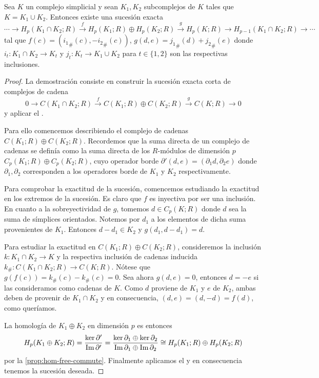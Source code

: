 \begin{proposicion}
	Sea $K$ un complejo simplicial y sean $K_1,K_2$ subcomplejos de $K$ tales que $K = K_1 \cup K_2$. Entonces existe una sucesión exacta
	\[
		\cdots \to H_p(K_1 \cap K_2;R) \overset{f}{\to} H_p(K_1;R) \oplus H_p(K_2;R) \overset{g}{\to} H_p(K;R) \to H_{p-1}(K_1 \cap K_2;R) \to \cdots
	\]
	tal que $f(c) = ({i_1}_\#(c),-{i_2}_\#(c))$, $g(d,e) = {j_1}_\#(d)+{j_2}_\#(e)$ donde $i_t: K_1 \cap K_2 \to K_t$ y $j_t: K_t \to K_1 \cup K_2$ para $t \in \{1,2\}$ son las respectivas inclusiones.
\end{proposicion}
\begin{proof}
	La demostración consiste en construir la sucesión exacta corta de complejos de cadena
	\[
		0 \to C(K_1 \cap K_2;R) \overset{f}{\to} C(K_1;R) \oplus C(K_2;R) \overset{g}{\to} C(K;R) \to 0
	\]
	y aplicar el .
	
	Para ello comencemos describiendo el complejo de cadenas $C(K_1;R) \oplus C(K_2;R)$. Recordemos que la suma directa de un complejo de cadenas se definía como la suma directa de los $R$-módulos de dimensión $p$ $C_p(K_1;R) \oplus C_p(K_2;R)$, cuyo operador borde $\partial'(d,e) = (\partial_1d, \partial_2 e)$ donde $\partial_1, \partial_2$ corresponden a los operadores borde de $K_1$ y $K_2$ respectivamente.
	
	Para comprobar la exactitud de la sucesión,  comencemos estudiando la exactitud en los extremos de la sucesión. Es claro que $f$ es inyectiva por ser una inclusión. En cuanto a la sobreyectividad de $g$, tomemos $d \in C_p(K;R)$ donde $d$ sea la suma de símplices orientados. Notemos por $d_1$ a los elementos de dicha suma provenientes de $K_1$. Entonces $d - d_1 \in K_2$ y $g(d_1, d-d_1) = d$.
	
	Para estudiar la exactitud en $C(K_1;R) \oplus C(K_2;R)$, consideremos la inclusión $k: K_1 \cap K_2 \to K$ y la respectiva inclusión de cadenas inducida $k_\#: C(K_1 \cap K_2;R) \to C(K;R)$. Nótese que $g(f(c)) = k_\#(c) - k_\#(c) = 0$. Sea ahora $g(d,e) = 0$, entonces $d = -e$ si las consideramos como cadenas de $K$. Como $d$ proviene de $K_1$ y $e$ de $K_2$, ambas deben de provenir de $K_1 \cap K_2$ y en consecuencia, $(d,e) = (d,-d) = f(d)$, como queríamos.
	
	La homología de $K_1 \oplus K_2$ en dimensión $p$ es entonces
	\[
		H_p(K_1 \oplus K_2;R) = \frac{\ker \partial'}{\operatorname{Im} \partial'} = \frac{\ker \partial_1 \oplus \ker \partial_2}{\operatorname{Im} \partial_1 \oplus \operatorname{Im} \partial_2} \cong H_p(K_1;R) \oplus H_p(K_2;R)
	\]
	por la \autoref{prop:hom-free-commute}. Finalmente aplicamos el  y en consecuencia tenemos la sucesión deseada.
	

\end{proof}
